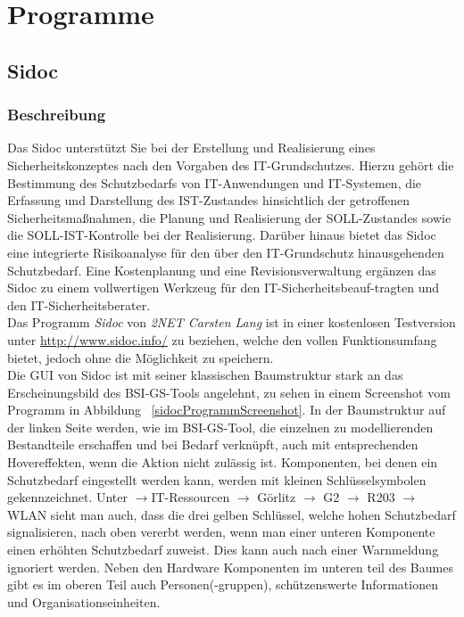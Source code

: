 \section{Programme}
\subsection{Sidoc}
\subsubsection{Beschreibung}
Das Sidoc unterstützt Sie bei der Erstellung und Realisierung eines Sicherheitskonzeptes nach den Vorgaben des IT-Grundschutzes. Hierzu gehört die Bestimmung des Schutzbedarfs von IT-Anwendungen und IT-Systemen, die Erfassung und Darstellung des IST-Zustandes hinsichtlich der getroffenen Sicherheitsmaßnahmen, die Planung und Realisierung der SOLL-Zustandes sowie die SOLL-IST-Kontrolle bei der Realisierung. Darüber hinaus bietet das Sidoc eine integrierte Risikoanalyse für den über den IT-Grundschutz hinausgehenden Schutzbedarf.
Eine Kostenplanung und eine Revisionsverwaltung ergänzen das Sidoc zu einem vollwertigen Werkzeug für den IT-Sicherheitsbeauf-tragten und den IT-Sicherheitsberater.\cite{sidocDoku}
\\
Das Programm \textit{Sidoc} von \textit{2NET Carsten Lang} ist in einer kostenlosen Testversion unter \url{http://www.sidoc.info/} zu beziehen, welche den vollen Funktionsumfang bietet, jedoch ohne die Möglichkeit zu speichern.
\\
Die GUI von Sidoc ist mit seiner klassischen Baumstruktur stark an das Erscheinungsbild des BSI-GS-Tools angelehnt, zu sehen in einem Screenshot vom Programm in Abbildung ~\ref{sidocProgrammScreenshot}. In der Baumstruktur auf der linken Seite werden, wie im BSI-GS-Tool, die einzelnen zu modellierenden Bestandteile erschaffen und bei Bedarf verknüpft, auch mit entsprechenden Hovereffekten, wenn die Aktion nicht zulässig ist.
Komponenten, bei denen ein Schutzbedarf eingestellt werden kann, werden mit kleinen Schlüsselsymbolen gekennzeichnet. Unter $\rightarrow$IT-Ressourcen $\rightarrow$ Görlitz $\rightarrow$ G2 $\rightarrow$ R203 $\rightarrow$ WLAN sieht man auch, dass die drei gelben Schlüssel, welche hohen Schutzbedarf signalisieren, nach oben vererbt werden, wenn man einer unteren Komponente einen erhöhten Schutzbedarf zuweist. Dies kann auch nach einer Warnmeldung ignoriert werden.
Neben den Hardware Komponenten im unteren teil des Baumes gibt es im oberen Teil auch Personen(-gruppen), schützenswerte Informationen und Organisationseinheiten.
